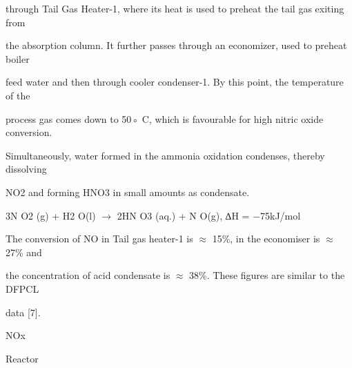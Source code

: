 \documentclass[a4paper,portrait,12pt]{article}
\begin{document}
\begin{flushleft}
through Tail Gas Heater-1, where its heat is used to preheat the tail gas exiting from
\end{flushleft}


\begin{flushleft}
the absorption column. It further passes through an economizer, used to preheat boiler
\end{flushleft}


\begin{flushleft}
feed water and then through cooler condenser-1. By this point, the temperature of the
\end{flushleft}


\begin{flushleft}
process gas comes down to 50◦ C, which is favourable for high nitric oxide conversion.
\end{flushleft}


\begin{flushleft}
Simultaneously, water formed in the ammonia oxidation condenses, thereby dissolving
\end{flushleft}


\begin{flushleft}
NO2 and forming HNO3 in small amounts as condensate.
\end{flushleft}


\begin{flushleft}
3N O2 (g) + H2 O(l) $\rightarrow$ 2HN O3 (aq.) + N O(g), ∆H = $-$75kJ/mol
\end{flushleft}


\begin{flushleft}
The conversion of NO in Tail gas heater-1 is $\approx$ 15\%, in the economiser is $\approx$ 27\% and
\end{flushleft}


\begin{flushleft}
the concentration of acid condensate is $\approx$ 38\%. These figures are similar to the DFPCL
\end{flushleft}


\begin{flushleft}
data [7].
\end{flushleft}





\begin{flushleft}
NOx
\end{flushleft}


\begin{flushleft}
Reactor
\end{flushleft}
\end{document}

